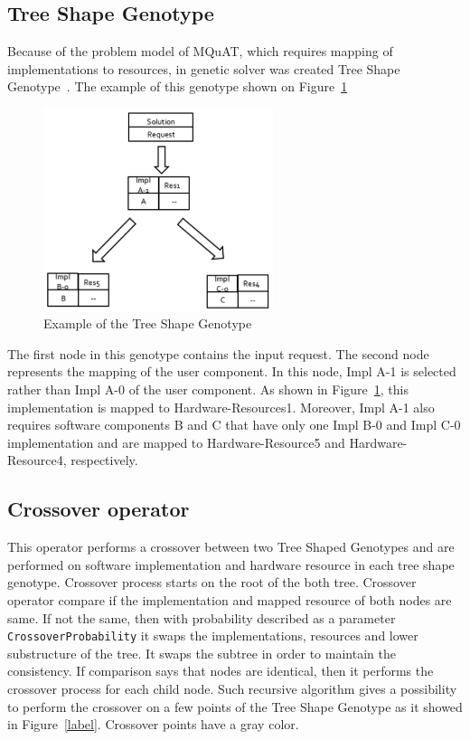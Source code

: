 \subsection{Tree Shape Genotype}

Because of the problem model of MQuAT, which requires mapping of implementations to resources, in genetic solver was created Tree Shape Genotype~\cite{ahmad18}.
The example of this genotype shown on Figure~\ref{fig:TreeShapeGenotypeExample}

\begin{figure}
	\centering
	\includegraphics[width=0.6\textwidth]{images/TreeShapeGenotypeExample.png}
	\caption[Example of the Tree Shape Genotype]{Example of the Tree Shape Genotype}
	\label{fig:TreeShapeGenotypeExample}
\end{figure}

The first node in this genotype contains the input request. The second node represents the mapping of the user component. In this node, Impl A-1 is selected rather than Impl A-0 of the user component. As shown in Figure~\ref{fig:TreeShapeGenotypeExample}, this implementation is mapped to Hardware-Resources1. Moreover, Impl A-1 also requires software components B and C that have only one Impl B-0 and Impl C-0 implementation and are mapped to Hardware-Resource5 and Hardware-Resource4, respectively.

\subsection{Crossover operator}
\label{sec:GeneticSolverCrossover}

This operator performs a crossover between two Tree Shaped Genotypes and are performed on software implementation and hardware resource in each tree shape genotype. 
Crossover process starts on the root of the both tree. Crossover operator compare if the implementation and mapped resource of both nodes are same. If not the same, then with probability described as a parameter \texttt{CrossoverProbability} it swaps the implementations, resources and lower substructure of the tree. It swaps the subtree in order to maintain the consistency. If comparison says that nodes are identical, then it performs the crossover process for each child node. Such recursive algorithm gives a possibility to perform the crossover on a few points of the Tree Shape Genotype as it showed in Figure~\ref{label}. Crossover points have a gray color.

